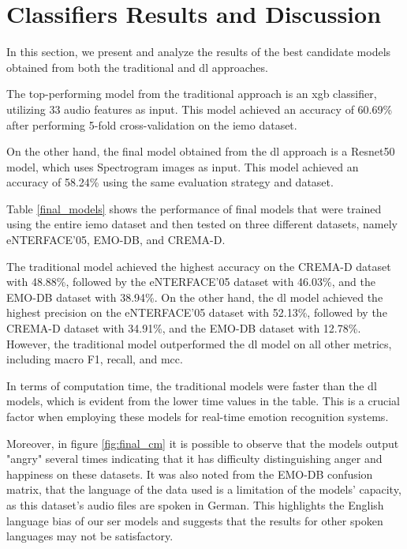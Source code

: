 \section{Classifiers Results and Discussion}

In this section, we present and analyze the results of the best candidate models obtained from both the traditional and \ac{dl} approaches.

The top-performing model from the traditional approach is an \ac{xgb} classifier, utilizing 33 audio features as input. This model achieved an accuracy of 60.69\% after performing 5-fold cross-validation on the \ac{iemo} dataset.

On the other hand, the final model obtained from the \ac{dl} approach is a Resnet50 model, which uses Spectrogram images as input. This model achieved an accuracy of 58.24\% using the same evaluation strategy and dataset.

Table \ref{final_models} shows the performance of final models that were trained using the entire \ac{iemo} dataset and then tested on three different datasets, namely eNTERFACE'05, EMO-DB, and CREMA-D.

The traditional model achieved the highest accuracy on the CREMA-D dataset with 48.88\%, followed by the eNTERFACE'05 dataset with 46.03\%, and the EMO-DB dataset with 38.94\%. On the other hand, the \ac{dl} model achieved the highest precision on the eNTERFACE'05 dataset with 52.13\%, followed by the CREMA-D dataset with 34.91\%, and the EMO-DB dataset with 12.78\%. However, the traditional model outperformed the \ac{dl} model on all other metrics, including macro F1, recall, and \ac{mcc}.

In terms of computation time, the traditional models were faster than the \ac{dl} models, which is evident from the lower time values in the table. This is a crucial factor when employing these models for real-time emotion recognition systems.

Moreover, in figure \ref{fig:final_cm} it is possible to observe that the models output "angry" several times indicating that it has difficulty distinguishing anger and happiness on these datasets. It was also noted from the EMO-DB confusion matrix, that the language of the data used is a limitation of the models' capacity, as this dataset's audio files are spoken in German. This highlights the English language bias of our \ac{ser} models and suggests that the results for other spoken languages may not be satisfactory.

